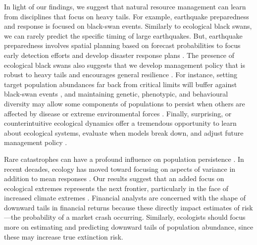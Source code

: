 \documentclass[9pt,twocolumn,twoside]{pnas-new}
\begin{document}
In light of our findings, we suggest that natural resource management can
learn from disciplines that focus on heavy tails. For example, earthquake
preparedness and response is focused on black-swan events. Similarly to
ecological black swans, we can rarely predict the specific timing of large
earthquakes. But, earthquake preparedness involves spatial planning based on
forecast probabilities to focus early detection efforts and develop disaster
response plans \cite{nrc2007}. The presence of ecological black swans also suggests that we
develop management policy that is robust to heavy tails and encourages
general resilience \cite{carpenter2012}. For instance, setting target
population abundances far back from critical limits will buffer against black-swan
events \cite{caddy1996}, and maintaining genetic, phenotypic, and behavioural
diversity may allow some components of populations to persist when others are
affected by disease or extreme environmental forces \cite{schindler2010}.
Finally, surprising, or counterintuitive ecological dynamics offer a tremendous
opportunity to learn about ecological systems, evaluate when models break down,
and adjust future management policy \cite{doak2008, lindenmayer2010}.

Rare catastrophes can have a profound influence on population
persistence \cite{mangel1994}. In recent decades, ecology has moved toward
focusing on aspects of variance in addition to mean
responses \cite{thompson2013}. Our results suggest that an added focus on
ecological extremes represents the next frontier, particularly in the face of
increased climate extremes \cite{meehl2004, ipcc2012, thompson2013}. Financial
analysts are concerned with the shape of downward tails in financial returns
because these directly impact estimates of risk---the probability of a
market crash occurring.
Similarly, ecologists should focus more
on estimating and predicting downward tails of population abundance, since
these may increase true extinction risk.
\end{document}
